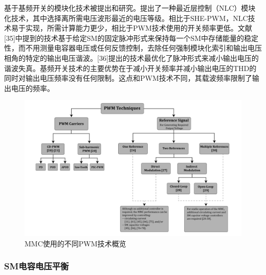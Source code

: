   基于基频开关的模块化技术被提出和研究。提出了一种最近层控制（NLC）模块化技术，其中选择离所需电压波形最近的电压等级。相比于SHE-PWM，NLC技术易于实现，所需计算能力更少，相比于PWM技术使用的开关频率更低。文献[35]中提到的技术基于给定SM的固定脉冲形式来保持每一个SM中存储能量的稳定性，而不用测量电容器电压或任何反馈控制，去除任何强制模块化索引和输出电压相角的特定的输出电压谐波。[36]提出的技术最优化了脉冲形式来减小输出电压的谐波失真。基频开关技术的主要优势在于减小开关频率并减小输出电压的THD的同时对输出电压频率没有任何限制。这点和PWM技术不同，其载波频率限制了输出电压的频率。
\begin{figure}[h]
\centering
\includegraphics[width=1.05\textwidth]{images/Paper_Fig_5.png}
\setcaptionwidth{\linewidth}
\caption{MMC使用的不同PWM技术概览}
\end{figure}
  
  \subsubsection{SM电容电压平衡}
  
